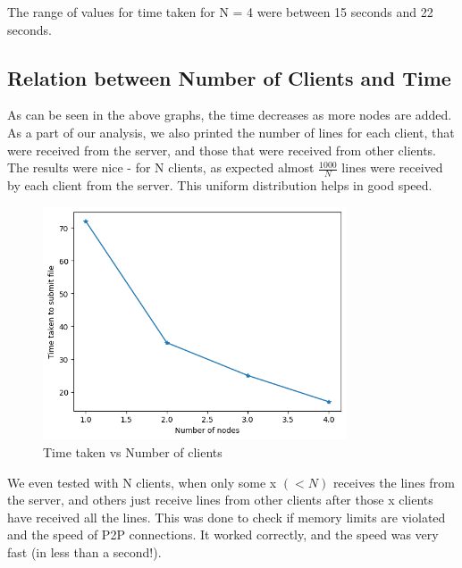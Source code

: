 \documentclass[12pt]{scrartcl}
\begin{document}
The range of values for time taken for N = 4 were between 15 seconds and 22 seconds.

\subsection{Relation between Number of Clients and Time}

As can be seen in the above graphs, the time decreases as more nodes are added. As a part of our analysis, we also printed the number of lines for each client, that were received from the server, and those that were received from other clients. The results were nice - for N clients, as expected almost \(\frac{1000}{N}\) lines were received by each client from the server. This uniform distribution helps in good speed. \\

\begin{figure}[H]
    \centering
    \includegraphics[width=0.8\textwidth]{images/download.png}
    \caption{Time taken vs Number of clients}
    \label{fig:my_label}
\end{figure}


We even tested with N clients, when only some x \((< N)\) receives the lines from the server, and others just receive lines from other clients after those x clients have received all the lines. This was done to check if memory limits are violated and the speed of P2P connections. It worked correctly, and the speed was very fast (in less than a second!). 
\end{document}
